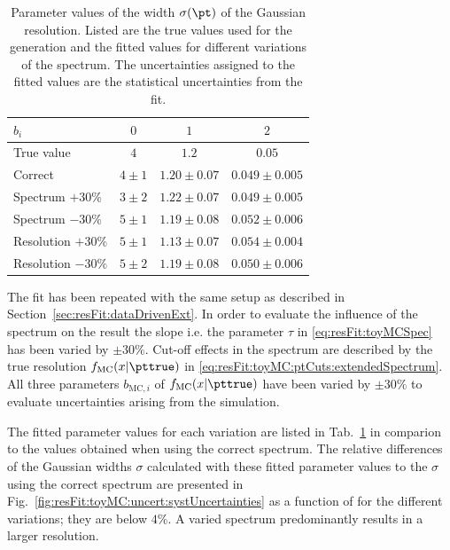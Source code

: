 \documentclass[a4paper]{cmspaper} %
\begin{document}
\begin{table}[ht]
  \centering
  \begin{tabular}[ht]{lccc}
    \hline \hline
    $b_{i}$ & $0$ & $1$ & $2$ \\
    \hline
    True value         & $4$       & $1.2$           & $0.05$ \\
    Correct            & $4 \pm 1$ & $1.20 \pm 0.07$ & $0.049 \pm 0.005$ \\
    Spectrum $+30\%$   & $3 \pm 2$ & $1.22 \pm 0.07$ & $0.049 \pm 0.005$ \\
    Spectrum $-30\%$   & $5 \pm 1$ & $1.19 \pm 0.08$ & $0.052 \pm 0.006$ \\
    Resolution $+30\%$ & $5 \pm 1$ & $1.13 \pm 0.07$ & $0.054 \pm 0.004$ \\
    Resolution $-30\%$ & $5 \pm 2$ & $1.19 \pm 0.08$ & $0.050 \pm 0.006$ \\
    \hline \hline
  \end{tabular}
  \caption{Parameter values of the width $\sigma(\pt)$ of the Gaussian resolution.
    Listed are the true values used for the generation and the fitted values for different variations of the spectrum.
    The uncertainties assigned to the fitted values are the statistical uncertainties from the fit.}
  \label{tab:resFit:toyMC:uncert:fitResult}
\end{table}

The fit has been repeated with the same setup as described in Section~\ref{sec:resFit:dataDrivenExt}.
In order to evaluate the influence of the spectrum on the result the slope i.e. the parameter $\tau$ in \eqref{eq:resFit:toyMCSpec} has been varied by $\pm30\%$.
Cut-off effects in the spectrum are described by the true resolution $f_{\text{MC}}(x|\pttrue)$ in \eqref{eq:resFit:toyMC:ptCuts:extendedSpectrum}.
All three parameters $b_{\text{MC},i}$ of $f_{\text{MC}}(x|\pttrue)$ have been varied by $\pm30\%$ to evaluate uncertainties arising from the simulation.

The fitted parameter values for each variation are listed in Tab.~\ref{tab:resFit:toyMC:uncert:fitResult} in comparion to the values obtained when using the correct spectrum.
The relative differences of the Gaussian widths $\sigma$ calculated with these fitted parameter values to the $\sigma$ using the correct spectrum are presented in Fig.~\ref{fig:resFit:toyMC:uncert:systUncertainties} as a function of \pt for the different variations; they are below $4\%$.
A varied spectrum predominantly results in a larger resolution.
\end{document}
